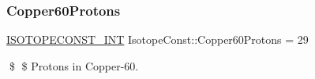 \subsubsection{\texorpdfstring{Copper60\+Protons}{Copper60Protons}}
{\footnotesize\ttfamily \mbox{\hyperlink{group___isotope_const-_macros_ga5f18360b3e99483a35c32d789e62621c}{I\+S\+O\+T\+O\+P\+E\+C\+O\+N\+S\+T\+\_\+\+I\+NT}} Isotope\+Const\+::\+Copper60\+Protons = 29}

\$ \$ Protons in Copper-\/60. 